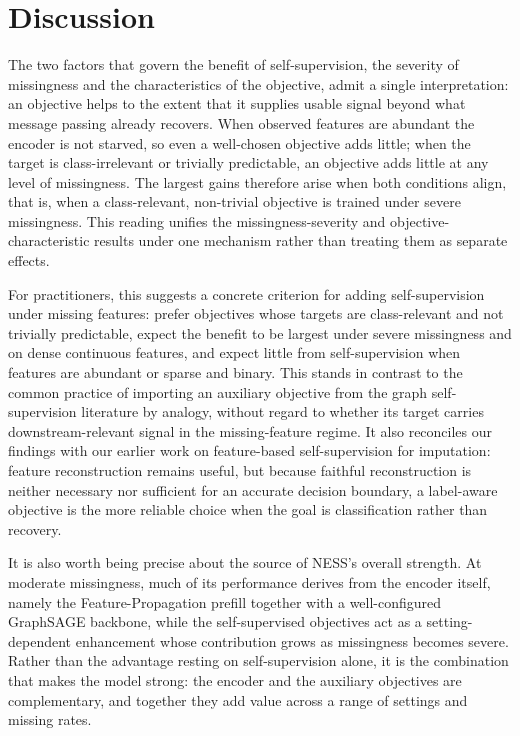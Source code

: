 \section{Discussion}
\label{sec:discussion}

The two factors that govern the benefit of self-supervision, the severity of missingness and the characteristics of the objective, admit a single interpretation: an objective helps to the extent that it supplies usable signal beyond what message passing already recovers. When observed features are abundant the encoder is not starved, so even a well-chosen objective adds little; when the target is class-irrelevant or trivially predictable, an objective adds little at any level of missingness. The largest gains therefore arise when both conditions align, that is, when a class-relevant, non-trivial objective is trained under severe missingness. This reading unifies the missingness-severity and objective-characteristic results under one mechanism rather than treating them as separate effects.

For practitioners, this suggests a concrete criterion for adding self-supervision under missing features: prefer objectives whose targets are class-relevant and not trivially predictable, expect the benefit to be largest under severe missingness and on dense continuous features, and expect little from self-supervision when features are abundant or sparse and binary. This stands in contrast to the common practice of importing an auxiliary objective from the graph self-supervision literature by analogy, without regard to whether its target carries downstream-relevant signal in the missing-feature regime. It also reconciles our findings with our earlier work on feature-based self-supervision for imputation: feature reconstruction remains useful, but because faithful reconstruction is neither necessary nor sufficient for an accurate decision boundary, a label-aware objective is the more reliable choice when the goal is classification rather than recovery.

It is also worth being precise about the source of NESS's overall strength. At moderate missingness, much of its performance derives from the encoder itself, namely the Feature-Propagation prefill together with a well-configured GraphSAGE backbone, while the self-supervised objectives act as a setting-dependent enhancement whose contribution grows as missingness becomes severe. Rather than the advantage resting on self-supervision alone, it is the combination that makes the model strong: the encoder and the auxiliary objectives are complementary, and together they add value across a range of settings and missing rates.


